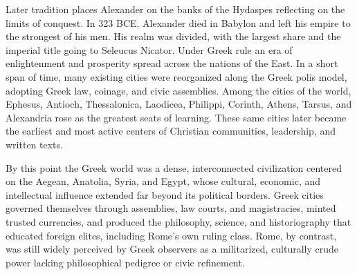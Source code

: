 Later tradition places Alexander on the banks of the Hydaspes reflecting on the limits of conquest.
In 323 BCE, Alexander died in Babylon and left his empire to the strongest of his men.
His realm was divided, with the largest share and the imperial title going to Seleucus Nicator.
Under Greek rule an era of enlightenment and prosperity spread across the nations of the East.
In a short span of time, many existing cities were reorganized along the Greek polis model, adopting Greek law, coinage, and civic assemblies.
Among the cities of the world, Ephesus, Antioch, Thessalonica, Laodicea, Philippi, Corinth, Athens, Tarsus, and Alexandria rose as the greatest seats of learning.
These same cities later became the earliest and most active centers of Christian communities, leadership, and written texts.

By this point the Greek world was a dense, interconnected civilization centered on the Aegean, Anatolia, Syria, and Egypt, whose cultural, economic, and intellectual influence extended far beyond its political borders.
Greek cities governed themselves through assemblies, law courts, and magistracies, minted trusted currencies, and produced the philosophy, science, and historiography that educated foreign elites, including Rome's own ruling class.
Rome, by contrast, was still widely perceived by Greek observers as a militarized, culturally crude power lacking philosophical pedigree or civic refinement.

